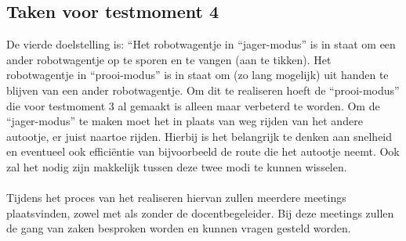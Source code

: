 \subsection{Taken voor testmoment 4}
De vierde doelstelling is: “Het robotwagentje in “jager-modus” is in staat om een ander robotwagentje op te sporen en te vangen (aan te tikken). Het robotwagentje in “prooi-modus” is in staat om (zo lang mogelijk) uit handen te blijven van een ander robotwagentje. Om dit te realiseren hoeft de “prooi-modus” die voor testmoment 3 al gemaakt is alleen maar verbeterd te worden. Om de “jager-modus” te maken moet het in plaats van weg rijden van het andere autootje, er juist naartoe rijden. Hierbij is het belangrijk te denken aan snelheid en eventueel ook efficiëntie van bijvoorbeeld de route die het autootje neemt. Ook zal het nodig zijn makkelijk tussen deze twee modi te kunnen wisselen. 
\\\\
Tijdens het proces van het realiseren hiervan zullen meerdere meetings plaatsvinden, zowel met als zonder de docentbegeleider. Bij deze meetings zullen de gang van zaken besproken worden en kunnen vragen gesteld worden. 
